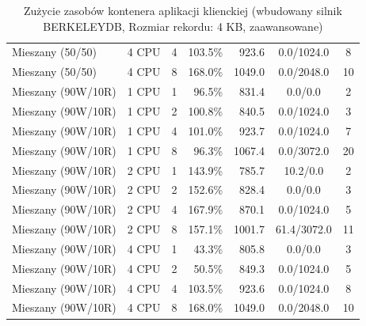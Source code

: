 \begin{table}[ht]
{\begin{tabular}{llcrrcc}
Mieszany (50/50) & 4 CPU & 4 & 103.5\% & 923.6 & 0.0/1024.0 & 8 \\
Mieszany (50/50) & 4 CPU & 8 & 168.0\% & 1049.0 & 0.0/2048.0 & 10 \\
Mieszany (90W/10R) & 1 CPU & 1 & 96.5\% & 831.4 & 0.0/0.0 & 2 \\
Mieszany (90W/10R) & 1 CPU & 2 & 100.8\% & 840.5 & 0.0/1024.0 & 3 \\
Mieszany (90W/10R) & 1 CPU & 4 & 101.0\% & 923.7 & 0.0/1024.0 & 7 \\
Mieszany (90W/10R) & 1 CPU & 8 & 96.3\% & 1067.4 & 0.0/3072.0 & 20 \\
Mieszany (90W/10R) & 2 CPU & 1 & 143.9\% & 785.7 & 10.2/0.0 & 2 \\
Mieszany (90W/10R) & 2 CPU & 2 & 152.6\% & 828.4 & 0.0/0.0 & 3 \\
Mieszany (90W/10R) & 2 CPU & 4 & 167.9\% & 870.1 & 0.0/1024.0 & 5 \\
Mieszany (90W/10R) & 2 CPU & 8 & 157.1\% & 1001.7 & 61.4/3072.0 & 11 \\
Mieszany (90W/10R) & 4 CPU & 1 & 43.3\% & 805.8 & 0.0/0.0 & 3 \\
Mieszany (90W/10R) & 4 CPU & 2 & 50.5\% & 849.3 & 0.0/1024.0 & 5 \\
Mieszany (90W/10R) & 4 CPU & 4 & 103.5\% & 923.6 & 0.0/1024.0 & 8 \\
Mieszany (90W/10R) & 4 CPU & 8 & 168.0\% & 1049.0 & 0.0/2048.0 & 10 \\
\bottomrule
\end{tabular}%
}
\caption{Zużycie zasobów kontenera aplikacji klienckiej (wbudowany silnik BERKELEYDB, Rozmiar rekordu: 4 KB, zaawansowane)}
\label{tab:resources_berkeleydb_medium_0}
\end{table}
